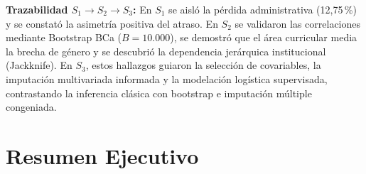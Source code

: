 \documentclass[11pt,a4paper]{article}
\begin{document}
\begin{conexionbox}
\textbf{Trazabilidad $S_1 \to S_2 \to S_3$:} En $S_1$ se aisló la pérdida administrativa (12,75\,\%) y se constató la asimetría positiva del atraso. En $S_2$ se validaron las correlaciones mediante Bootstrap BCa ($B=10.000$), se demostró que el área curricular media la brecha de género y se descubrió la dependencia jerárquica institucional (Jackknife). En $S_3$, estos hallazgos guiaron la selección de covariables, la imputación multivariada informada y la modelación logística supervisada, contrastando la inferencia clásica con bootstrap e imputación múltiple congeniada.
\end{conexionbox}

\vspace{0.4em}
\section*{Resumen Ejecutivo}
\end{document}

